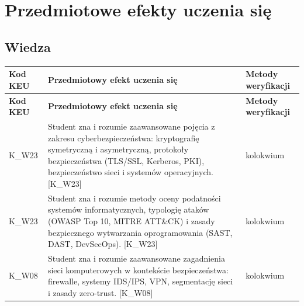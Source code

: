 \documentclass[12pt, a4paper]{article}
\newcommand{\thdrule}{\noalign{\global\setlength{\extrarowheight}{0pt}}}
\newcommand{\thdend}{\noalign{\global\setlength{\extrarowheight}{3pt}}}
\begin{document}
\section{Przedmiotowe efekty uczenia się}

\subsection*{Wiedza}
{\scriptsize
\begin{longtable}{m{1.6cm}m{9.0cm}m{4.2cm}}
\thdrule\toprule
\rowcolor{pjatkRed} {\color{white}\footnotesize\textbf{\vphantom{Ag}Kod KEU}} & {\color{white}\footnotesize\textbf{\vphantom{Ag}Przedmiotowy efekt uczenia się}} & {\color{white}\footnotesize\textbf{\vphantom{Ag}Metody weryfikacji}} \\
\midrule\thdend
\endfirsthead
\thdrule\toprule
\rowcolor{pjatkRed} {\color{white}\footnotesize\textbf{\vphantom{Ag}Kod KEU}} & {\color{white}\footnotesize\textbf{\vphantom{Ag}Przedmiotowy efekt uczenia się}} & {\color{white}\footnotesize\textbf{\vphantom{Ag}Metody weryfikacji}} \\
\midrule\thdend
\endhead
  \rowcolor{tableRowLight} K\_W23 & Student zna i rozumie zaawansowane pojęcia z zakresu cyberbezpieczeństwa: kryptografię symetryczną i asymetryczną, protokoły bezpieczeństwa (TLS/SSL, Kerberos, PKI), bezpieczeństwo sieci i systemów operacyjnych. {[}K\_W23{]} & kolokwium \\
  \rowcolor{tableRowAlt} K\_W23 & Student zna i rozumie metody oceny podatności systemów informatycznych, typologię ataków (OWASP Top 10, MITRE ATT\&CK) i zasady bezpiecznego wytwarzania oprogramowania (SAST, DAST, DevSecOps). {[}K\_W23{]} & kolokwium \\
  \rowcolor{tableRowLight} K\_W08 & Student zna i rozumie zaawansowane zagadnienia sieci komputerowych w kontekście bezpieczeństwa: firewalle, systemy IDS/IPS, VPN, segmentację sieci i zasady zero-trust. {[}K\_W08{]} & kolokwium \\
\bottomrule
\end{longtable}}
\end{document}
